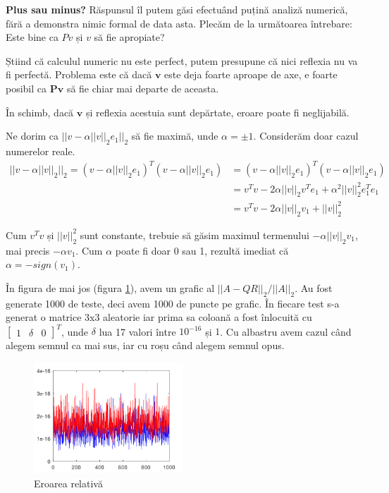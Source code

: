 \documentclass{exam}
\begin{document}
\textbf{Plus sau minus?} Răspunsul îl putem găsi efectuând puțină analiză
numerică, fără a demonstra nimic formal de data asta. Plecăm de la următoarea
întrebare: Este bine ca $Pv$ și $v$ să fie apropiate?

Știind că calculul numeric nu este perfect, putem presupune că nici
reflexia nu va fi perfectă. Problema este că dacă $\mathbf{v}$ este deja foarte
aproape de axe, e foarte posibil ca $\mathbf{Pv}$ să fie chiar mai departe de
aceasta.

În schimb, dacă $\mathbf{v}$ și reflexia acestuia sunt depărtate,
eroare poate fi neglijabilă.

Ne dorim ca $||v - \alpha ||v||_2 e_1||_2$ să fie maximă, unde
$\alpha = \pm 1$. Considerăm doar cazul numerelor reale.
\begin{align*}
	||v - \alpha ||v||_2||_2 = (v - \alpha ||v||_2 e_1)^T (v - \alpha ||v||_2 e_1) & = (v - \alpha ||v||_2 e_1)^T(v - \alpha ||v||_2 e_1)           \\
	                                                                               & = v^Tv - 2 \alpha ||v||_2 v^Te_1 + \alpha^2 ||v||_2^2 e_1^Te_1 \\
	                                                                               & = v^Tv - 2 \alpha ||v||_2 v_1 + ||v||_2^2
\end{align*}

Cum $v^Tv$ și $||v||_2^2$ sunt constante, trebuie să găsim maximul
termenului $- \alpha ||v||_2 v_1$, mai precis $- \alpha v_1$. Cum $\alpha$ poate fi
doar 0 sau 1, rezultă imediat că $\alpha = -sign(v_1)$.

\newpage
În figura de mai jos (figura \ref{fig:5}), avem un grafic al
$||A - QR||_2 / ||A||_2$. Au fost generate 1000 de teste, deci avem 1000 de puncte pe
grafic. În fiecare test s-a generat o matrice 3x3 aleatorie iar prima sa coloană
a fost înlocuită cu $\begin{bmatrix} 1 & \delta & 0 \end{bmatrix}^T$, unde
$\delta$ lua 17 valori între $10^{-16}$ și $1$. Cu albastru avem cazul când
alegem semnul ca mai sus, iar cu roșu când alegem semnul opus.

\begin{figure}[ht]
	\centering
	\includegraphics[width=0.5\textwidth]{hbad}
	\caption{Eroarea relativă}
	\label{fig:5}
\end{figure}
\end{document}
